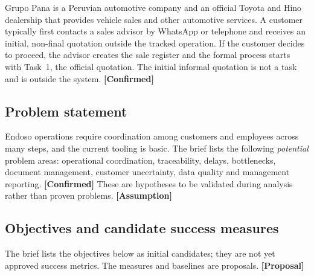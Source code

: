 \documentclass[11pt,a4paper]{article}
\newcommand{\tagconf}{\textcolor{green!45!black}{\textbf{[Confirmed]}}}
\newcommand{\tagprop}{\textcolor{orange!80!black}{\textbf{[Proposal]}}}
\newcommand{\tagassm}{\textcolor{blue!60!black}{\textbf{[Assumption]}}}
\begin{document}
Grupo Pana is a Peruvian automotive company and an official Toyota and Hino dealership that provides vehicle sales and other automotive services. A customer typically first contacts a sales advisor by WhatsApp or telephone and receives an initial, non-final quotation outside the tracked operation. If the customer decides to proceed, the advisor creates the sale register and the formal process starts with Task~1, the official quotation. The initial informal quotation is not a task and is outside the system. \tagconf{}

\subsection{Problem statement}

Endoso operations require coordination among customers and employees across many steps, and the current tooling is basic. The brief lists the following \emph{potential} problem areas: operational coordination, traceability, delays, bottlenecks, document management, customer uncertainty, data quality and management reporting. \tagconf{} These are hypotheses to be validated during analysis rather than proven problems. \tagassm{}

\subsection{Objectives and candidate success measures}

The brief lists the objectives below as initial candidates; they are not yet approved success metrics. The measures and baselines are proposals. \tagprop{}
\end{document}
